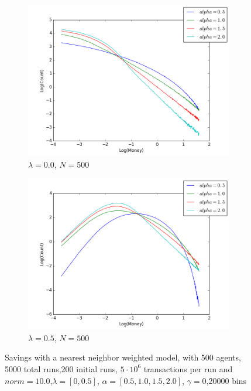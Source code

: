 \documentclass[a4paper,11pt]{article}
\begin{document}
{\begin{figure}[H]
	\centering
	\begin{subfigure}[t]{0.45\textwidth}
		\includegraphics[scale=0.4]{nearestneighbor_lambda=0_0_agens=500}
		\caption{$\lambda = 0.0$, $N=500$}
		\label{fig:0.0_500}
	\end{subfigure}
	\begin{subfigure}[t]{0.45\textwidth}
		\includegraphics[scale=0.4]{nearestneighbor_lambda=0_5_agens=500}
		\caption{$\lambda = 0.5$, $N=500$}
		\label{fig:0.5_500}
	\end{subfigure}
	\caption{Savings with a nearest neighbor weighted  model, with 500 agents, 5000 total runs,200 initial runs,  $5\cdot 10^{6}$ transactions per run and  $norm=10.0$,$\lambda=[0,0.5]$, $\alpha=[0.5,1.0,1.5,2.0]$, $\gamma=0$,20000 bins}
	\label{fig:alpha_n500}
\end{figure}


}
\end{document}
